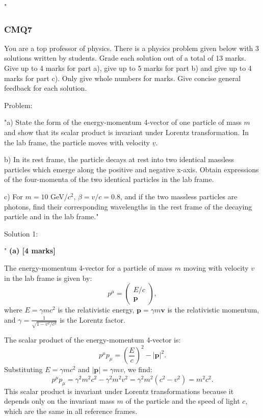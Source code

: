 "

\subsubsection{CMQ7}

You are a top professor of physics. There is a physics problem given below with 3 solutions written by students. Grade each solution out of a total of 13 marks. Give up to 4 marks for part a), give up to 5 marks for part b) and give up to 4 marks for part c). Only give whole numbers for marks. Give concise general feedback for each solution.

Problem:

"a) State the form of the energy-momentum 4-vector of one particle of mass \( m \) and show that its scalar product is invariant under Lorentz transformation. In the lab frame, the particle moves with velocity \( \underline{v} \). 

b) In its rest frame, the particle decays at rest into two identical massless particles which emerge along the positive and negative x-axis. Obtain expressions of the four-momenta of the two identical particles in the lab frame. 
    
c) For \( m = 10 \) GeV/\( c^{2} \), \( \beta = v/c = 0.8 \), and if the two massless particles are photons, find their corresponding wavelengths in the rest frame of the decaying particle and in the lab frame."

Solution 1: 

"
\textbf{(a) [4 marks]} 

The energy-momentum 4-vector for a particle of mass \(m\) moving with velocity \(v\) in the lab frame is given by:
\[
p^\mu = \begin{pmatrix}
E/c \\
\mathbf{p}
\end{pmatrix},
\]
where \(E = \gamma m c^2\) is the relativistic energy, \(\mathbf{p} = \gamma m \mathbf{v}\) is the relativistic momentum, and \(\gamma = \frac{1}{\sqrt{1 - v^2/c^2}}\) is the Lorentz factor. 

The scalar product of the energy-momentum 4-vector is:
\[
p^\mu p_\mu = \left(\frac{E}{c}\right)^2 - |\mathbf{p}|^2.
\]
Substituting \(E = \gamma mc^2\) and \(|\mathbf{p}| = \gamma mv\), we find:
\[
p^\mu p_\mu = \gamma^2 m^2 c^2 - \gamma^2 m^2 v^2 = \gamma^2 m^2 (c^2 - v^2) = m^2 c^2.
\]
This scalar product is invariant under Lorentz transformations because it depends only on the invariant mass \(m\) of the particle and the speed of light \(c\), which are the same in all reference frames.

